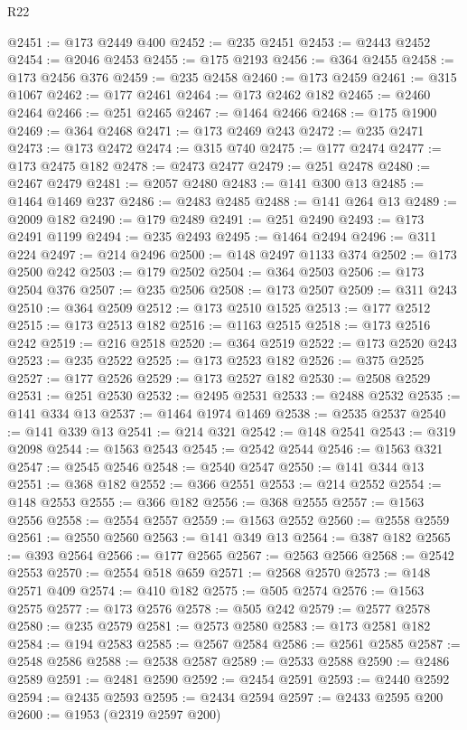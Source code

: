 \begin{lexlean}{R22}
\begin{coremodule}
@2451 := @173 @2449 @400
@2452 := @235 @2451
@2453 := @2443 @2452
@2454 := @2046 @2453
@2455 := @175 @2193
@2456 := @364 @2455
@2458 := @173 @2456 @376
@2459 := @235 @2458
@2460 := @173 @2459
@2461 := @315 @1067
@2462 := @177 @2461
@2464 := @173 @2462 @182
@2465 := @2460 @2464
@2466 := @251 @2465
@2467 := @1464 @2466
@2468 := @175 @1900
@2469 := @364 @2468
@2471 := @173 @2469 @243
@2472 := @235 @2471
@2473 := @173 @2472
@2474 := @315 @740
@2475 := @177 @2474
@2477 := @173 @2475 @182
@2478 := @2473 @2477
@2479 := @251 @2478
@2480 := @2467 @2479
@2481 := @2057 @2480
@2483 := @141 @300 @13
@2485 := @1464 @1469 @237
@2486 := @2483 @2485
@2488 := @141 @264 @13
@2489 := @2009 @182
@2490 := @179 @2489
@2491 := @251 @2490
@2493 := @173 @2491 @1199
@2494 := @235 @2493
@2495 := @1464 @2494
@2496 := @311 @224
@2497 := @214 @2496
@2500 := @148 @2497 @1133 @374
@2502 := @173 @2500 @242
@2503 := @179 @2502
@2504 := @364 @2503
@2506 := @173 @2504 @376
@2507 := @235 @2506
@2508 := @173 @2507
@2509 := @311 @243
@2510 := @364 @2509
@2512 := @173 @2510 @1525
@2513 := @177 @2512
@2515 := @173 @2513 @182
@2516 := @1163 @2515
@2518 := @173 @2516 @242
@2519 := @216 @2518
@2520 := @364 @2519
@2522 := @173 @2520 @243
@2523 := @235 @2522
@2525 := @173 @2523 @182
@2526 := @375 @2525
@2527 := @177 @2526
@2529 := @173 @2527 @182
@2530 := @2508 @2529
@2531 := @251 @2530
@2532 := @2495 @2531
@2533 := @2488 @2532
@2535 := @141 @334 @13
@2537 := @1464 @1974 @1469
@2538 := @2535 @2537
@2540 := @141 @339 @13
@2541 := @214 @321
@2542 := @148 @2541
@2543 := @319 @2098
@2544 := @1563 @2543
@2545 := @2542 @2544
@2546 := @1563 @321
@2547 := @2545 @2546
@2548 := @2540 @2547
@2550 := @141 @344 @13
@2551 := @368 @182
@2552 := @366 @2551
@2553 := @214 @2552
@2554 := @148 @2553
@2555 := @366 @182
@2556 := @368 @2555
@2557 := @1563 @2556
@2558 := @2554 @2557
@2559 := @1563 @2552
@2560 := @2558 @2559
@2561 := @2550 @2560
@2563 := @141 @349 @13
@2564 := @387 @182
@2565 := @393 @2564
@2566 := @177 @2565
@2567 := @2563 @2566
@2568 := @2542 @2553
@2570 := @2554 @518 @659
@2571 := @2568 @2570
@2573 := @148 @2571 @409
@2574 := @410 @182
@2575 := @505 @2574
@2576 := @1563 @2575
@2577 := @173 @2576
@2578 := @505 @242
@2579 := @2577 @2578
@2580 := @235 @2579
@2581 := @2573 @2580
@2583 := @173 @2581 @182
@2584 := @194 @2583
@2585 := @2567 @2584
@2586 := @2561 @2585
@2587 := @2548 @2586
@2588 := @2538 @2587
@2589 := @2533 @2588
@2590 := @2486 @2589
@2591 := @2481 @2590
@2592 := @2454 @2591
@2593 := @2440 @2592
@2594 := @2435 @2593
@2595 := @2434 @2594
@2597 := @2433 @2595 @200
@2600 := @1953 (@2319 @2597 @200)

\end{coremodule}
\end{lexlean}
